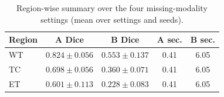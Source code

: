 \begin{table}[t]
\centering
\caption{Region-wise summary over the four missing-modality settings (mean over settings and seeds).}
\label{tab:region}
\begin{tabular}{lcccc}
\toprule
Region & A Dice & B Dice & A sec. & B sec. \\
\midrule
WT & $0.824\pm0.056$ & $0.553\pm0.137$ & 0.41 & 6.05 \\
TC & $0.698\pm0.056$ & $0.360\pm0.071$ & 0.41 & 6.05 \\
ET & $0.601\pm0.113$ & $0.228\pm0.083$ & 0.41 & 6.05 \\
\bottomrule
\end{tabular}
\end{table}
